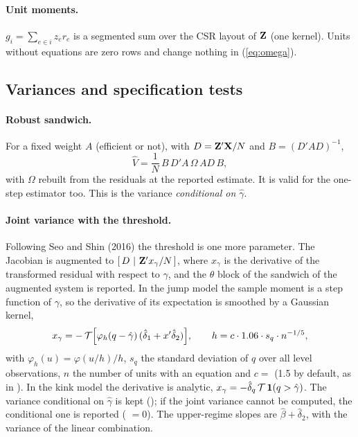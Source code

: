 \paragraph{Unit moments.} $g_i=\sum_{e\in i}z_e r_e$ is a segmented sum over the CSR layout of $\mathbf{Z}$
(one kernel). Units without equations are zero rows and change nothing in (\ref{eq:omega}).

\subsection{Variances and specification tests}\label{note:var}

\paragraph{Robust sandwich.} For a fixed weight $A$ (efficient or not), with $D=\mathbf{Z}'\mathbf{X}/N$ and
$B=(D'AD)^{-1}$,
\begin{equation}\label{eq:sandwich}
\widehat V=\frac1N\,B\,D'A\,\Omega\,A D\,B,
\end{equation}
with $\Omega$ rebuilt from the residuals at the reported estimate. It is valid for the one-step
estimator too. This is the variance \emph{conditional on $\hat\gamma$}.

\paragraph{Joint variance with the threshold.} Following Seo and Shin (2016) the threshold is one more
parameter. The Jacobian is augmented to $[\,D\ |\ \bZ'x_\gamma/N\,]$, where $x_\gamma$ is the
derivative of the transformed residual with respect to $\gamma$, and the $\theta$ block of the
sandwich of the augmented system is reported. In the jump model the sample moment is a step function
of $\gamma$, so the derivative of its expectation is smoothed by a Gaussian kernel,
\begin{equation}\label{eq:xg}
x_\gamma=-\,\mathcal T\Bigl[\varphi_h(q-\hat\gamma)\,(\hat\delta_1+x'\hat\delta_2)\Bigr],\qquad
h=c\cdot1.06\cdot s_q\cdot n^{-1/5},
\end{equation}
with $\varphi_h(u)=\varphi(u/h)/h$, $s_q$ the standard deviation of $q$ over all level observations,
$n$ the number of units with an equation and $c=$  (1.5 by default, as in
). In the kink model the derivative is analytic, $x_\gamma=-\hat\delta_q\,\mathcal T\,\mathbf{1}(q>\hat\gamma)$.
The variance conditional on $\hat\gamma$ is kept (); if the joint variance cannot be
computed, the conditional one is reported ( $=0$). The upper-regime slopes are
$\hat\beta+\hat\delta_2$, with the variance of the linear combination.

